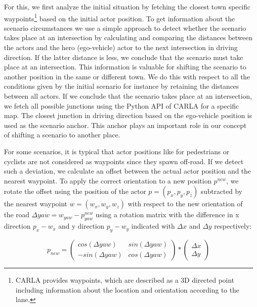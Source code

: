 \documentclass[conference, a4paper, 11pt]{IEEEtran}
\begin{document}
For this, we first analyze the initial situation by fetching the closest town specific waypoints\footnote{CARLA provides waypoints, which are described as a 3D directed point including information about the location and orientation according to the lane. } based on the initial actor position. To get information about the scenario circumstances we use a simple approach to detect whether the scenario takes place at an intersection by calculating and comparing the distances between the actors and the hero (ego-vehicle) actor to the next intersection in driving direction. If the latter distance is less, we conclude that the scenario must take place at an intersection. This information is valuable for shifting the scenario to another  position in the same or different town. We do this with respect to all the conditions given by the initial scenario for instance by retaining the distances between all actors.
If we conclude that the scenario takes place at an intersection, we fetch all possible junctions using the Python API of CARLA for a specific map. The closest junction in driving direction based on the ego-vehicle position is used  as the scenario anchor. This anchor plays an important role in our concept of shifting a scenario to another place.

For some scenarios, it is typical that actor positions like for pedestrians or cyclists are not considered as waypoints since they spawn off-road.  If we detect such a deviation, we calculate an offset between the actual actor position and the nearest waypoint. To apply the correct orientation to a new position $p^{new}$, we rotate the offset using the position of the actor $p = (p_x,p_y,p_z)$ subtracted by the nearest waypoint $w = (w_x, w_y, w_z)$ with respect to the new orientation of the road $\Delta yaw = w_{yaw} - p^{new}_{yaw}$  using a rotation matrix with the difference in x direction $p_x - w_x$ and y direction $p_y - w_y$ indicated with $\Delta x$ and $\Delta y$ respectively:

\begin{equation}
	p_{new} = \left(\begin{matrix} cos(\Delta yaw) & sin(\Delta yaw) \\ - sin(\Delta yaw) & cos(\Delta yaw) \end{matrix}\right) *  \left(\begin{matrix} \Delta x \\ \Delta y \end{matrix}\right) 
\end{equation}
\end{document}
